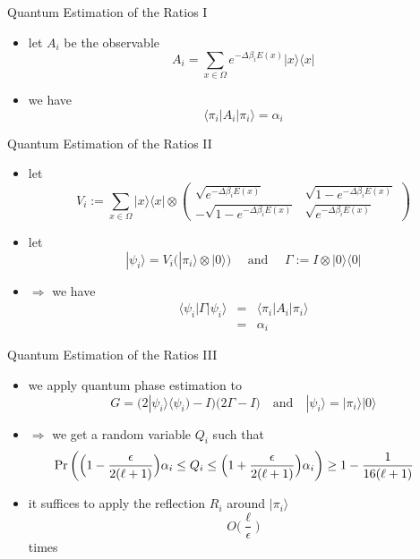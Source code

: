 \documentclass[slideColor]{prosper}
\renewcommand{\>}{\rangle}
\newcommand{\<}{\langle}
\begin{document}

\begin{slide}{Quantum Estimation of the Ratios I}
\begin{itemize}
\item let $A_i$ be the observable
\[
A_i = \sum_{x\in\Omega} e^{-\Delta\beta_i E(x)} |x\>\<x|
\]

\medskip
\item we have 
\[
\<\pi_i|A_i|\pi_i\> = \alpha_i
\]
\end{itemize}
\end{slide}


\begin{slide}{Quantum Estimation of the Ratios II}
\begin{itemize}
\item let 
\[
V_i := \sum_{x\in\Omega} |x\>\<x| \otimes
\left(
\begin{array}{cc}
 \sqrt{e^{-\Delta\beta_i E(x)}}   & \sqrt{1-e^{-\Delta\beta_i E(x)}} \\
-\sqrt{1-e^{-\Delta\beta_i E(x)}} & \sqrt{e^{-\Delta\beta_i E(x)}}
\end{array}
\right)
\]

\medskip
\item let 
\[
|\psi_i\> = V_i \Big( |\pi_i\> \otimes |0\> \Big) \quad \mbox{ and } \quad \Gamma := I \otimes |0\>\<0|
\]

\medskip
\item $\Rightarrow$ we have
\begin{eqnarray*}
\<\psi_i|\Gamma|\psi_i\> & = & \<\pi_i|A_i|\pi_i\> \\
& = & \alpha_i
\end{eqnarray*}
\end{itemize}
\end{slide}


\begin{slide}{Quantum Estimation of the Ratios III}
\begin{itemize}
\item we apply quantum phase estimation to 
\[
G = \big(2|\psi_i\>\<\psi_i)-I\big) \big( 2\Gamma - I \big) \quad\mbox{and}\quad
|\psi_i\> = |\pi_i\>|0\>
\]

\item $\Rightarrow$ we get a random variable $Q_i$ such that
\[
\hspace{-0.5cm}
\Pr\left( \Big(1-\frac{\epsilon}{2(\ell+1)}\Big)\alpha_i \le Q_i \le \Big(1+\frac{\epsilon}{2(\ell+1)}\Big)\alpha_i \right) \ge 1 - \frac{1}{16(\ell+1)}
\]

\medskip
\item it suffices to apply the reflection $R_i$ around $|\pi_i\>$
\[
O\Big(
\frac{\ell}{\epsilon}
\Big)
\]
times
\end{itemize}
\end{slide}
\end{document}
